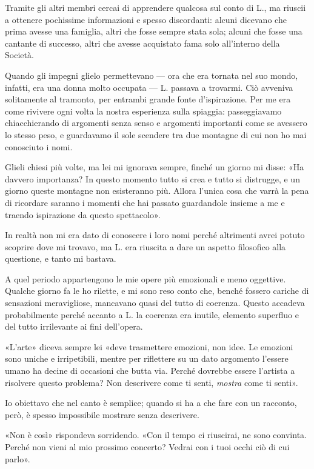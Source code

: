 \documentclass[a4paper,12pt]{book}
\begin{document}
Tramite gli altri membri cercai di apprendere qualcosa sul conto di L., ma riuscii
a ottenere pochissime informazioni e spesso discordanti: alcuni dicevano che
prima avesse una famiglia, altri che fosse sempre stata sola; alcuni che fosse
una cantante di successo, altri che avesse acquistato fama solo all'interno della
Società.

Quando gli impegni glielo permettevano --- ora che era tornata nel suo mondo,
infatti, era una donna molto occupata --- L. passava a trovarmi. Ciò avveniva
solitamente al tramonto, per entrambi grande fonte d'ispirazione. Per me era
come rivivere ogni volta la nostra esperienza sulla spiaggia: passeggiavamo
chiacchierando di argomenti senza senso e argomenti importanti come se avessero
lo stesso peso, e guardavamo il sole scendere tra due montagne di cui non ho
mai conosciuto i nomi.

Glieli chiesi più volte, ma lei mi ignorava sempre, finché un giorno mi disse:
«Ha davvero importanza? In questo momento tutto si crea e tutto si distrugge,
e un giorno queste montagne non esisteranno più. Allora l'unica cosa che varrà
la pena di ricordare saranno i momenti che hai passato guardandole insieme a me
e traendo ispirazione da questo spettacolo».

In realtà non mi era dato di conoscere i loro nomi perché altrimenti avrei potuto
scoprire dove mi trovavo, ma L. era riuscita a dare un aspetto filosofico alla
questione, e tanto mi bastava.

A quel periodo appartengono le mie opere più emozionali e meno oggettive. Qualche
giorno fa le ho rilette, e mi sono reso conto che, benché fossero cariche di
sensazioni meravigliose, mancavano quasi del tutto di coerenza. Questo accadeva
probabilmente perché accanto a L. la coerenza era inutile, elemento superfluo e
del tutto irrilevante ai fini dell'opera.

«L'arte» diceva sempre lei «deve trasmettere emozioni, non idee. Le emozioni sono
uniche e irripetibili, mentre per riflettere su un dato argomento l'essere umano
ha decine di occasioni che butta via. Perché dovrebbe essere l'artista a risolvere
questo problema? Non descrivere come ti senti, \emph{mostra} come ti senti».

Io obiettavo che nel canto è semplice; quando si ha a che fare con un racconto,
però, è spesso impossibile mostrare senza descrivere.

«Non è così» rispondeva sorridendo. «Con il tempo ci riuscirai, ne sono convinta.
Perché non vieni al mio prossimo concerto? Vedrai con i tuoi occhi ciò di cui
parlo».
\end{document}
